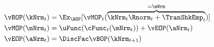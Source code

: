   \begin{equation}\begin{gathered}\begin{aligned}
\vBOP(\kNrm_{t}) & = \Ex_{\BOP}[\vMOP_{t}(\overbrace{\kNrm_{t} \Rnorm_{t} + \TranShkEmp_{t}}^{=\mNrm})] \label{eq:vBOP} \\
\vMOP(\mNrm_{t}) & = \uFunc(\cFunc_{t}(\mNrm_{t})) + \vEOP(\aNrm_{t})\label{eq:vMOP} \\
\vEOP(\aNrm_{t}) & = \DiscFac \vBOP(\kNrm_{t+1})\label{eq:vEOP} \\
      \end{aligned}\end{gathered}\end{equation}
